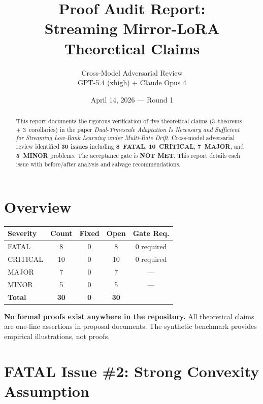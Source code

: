 \documentclass[11pt,a4paper]{article}
\title{Proof Audit Report:\\Streaming Mirror-LoRA Theoretical Claims}
\author{Cross-Model Adversarial Review\\GPT-5.4 (xhigh) + Claude Opus 4}
\date{April 14, 2026 --- Round 1}
\begin{document}
\maketitle

\begin{abstract}
This report documents the rigorous verification of five theoretical claims
(3~theorems + 3~corollaries) in the paper
\emph{Dual-Timescale Adaptation Is Necessary and Sufficient for Streaming
Low-Rank Learning under Multi-Rate Drift}.
Cross-model adversarial review identified \textbf{30 issues} including
\textbf{8~FATAL}, \textbf{10~CRITICAL}, \textbf{7~MAJOR}, and
\textbf{5~MINOR} problems.
The acceptance gate is \textbf{NOT MET}.
This report details each issue with before/after analysis and salvage recommendations.
\end{abstract}

\tableofcontents
\newpage

\section{Overview}

\begin{center}
\begin{tabular}{lcccc}
\toprule
\textbf{Severity} & \textbf{Count} & \textbf{Fixed} & \textbf{Open} & \textbf{Gate Req.} \\
\midrule
FATAL    & 8  & 0 & 8  & 0 required \\
CRITICAL & 10 & 0 & 10 & 0 required \\
MAJOR    & 7  & 0 & 7  & --- \\
MINOR    & 5  & 0 & 5  & --- \\
\midrule
\textbf{Total} & \textbf{30} & \textbf{0} & \textbf{30} & \\
\bottomrule
\end{tabular}
\end{center}

\begin{warningbox}
\textbf{No formal proofs exist anywhere in the repository.}
All theoretical claims are one-line assertions in proposal documents.
The synthetic benchmark provides empirical illustrations, not proofs.
\end{warningbox}

\section{FATAL Issue \#2: Strong Convexity Assumption}
\end{document}
